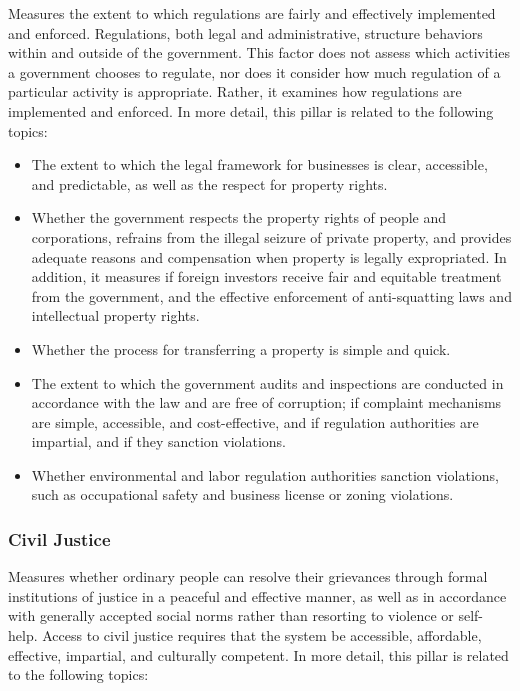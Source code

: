 \documentclass[
]{agujournal2019}
\providecommand{\tightlist}{%
  \setlength{\itemsep}{0pt}\setlength{\parskip}{0pt}}\usepackage{longtable,booktabs,array}
\begin{document}
Measures the extent to which regulations are fairly and effectively
implemented and enforced. Regulations, both legal and administrative,
structure behaviors within and outside of the government. This factor
does not assess which activities a government chooses to regulate, nor
does it consider how much regulation of a particular activity is
appropriate. Rather, it examines how regulations are implemented and
enforced. In more detail, this pillar is related to the following
topics:

\begin{itemize}
\tightlist
\item
  The extent to which the legal framework for businesses is clear,
  accessible, and predictable, as well as the respect for property
  rights.
\item
  Whether the government respects the property rights of people and
  corporations, refrains from the illegal seizure of private property,
  and provides adequate reasons and compensation when property is
  legally expropriated. In addition, it measures if foreign investors
  receive fair and equitable treatment from the government, and the
  effective enforcement of anti-squatting laws and intellectual property
  rights.
\item
  Whether the process for transferring a property is simple and quick.
\item
  The extent to which the government audits and inspections are
  conducted in accordance with the law and are free of corruption; if
  complaint mechanisms are simple, accessible, and cost-effective, and
  if regulation authorities are impartial, and if they sanction
  violations.
\item
  Whether environmental and labor regulation authorities sanction
  violations, such as occupational safety and business license or zoning
  violations.
\end{itemize}

\subsubsection{Civil Justice}\label{civil-justice}

Measures whether ordinary people can resolve their grievances through
formal institutions of justice in a peaceful and effective manner, as
well as in accordance with generally accepted social norms rather than
resorting to violence or self-help. Access to civil justice requires
that the system be accessible, affordable, effective, impartial, and
culturally competent. In more detail, this pillar is related to the
following topics:
\end{document}
